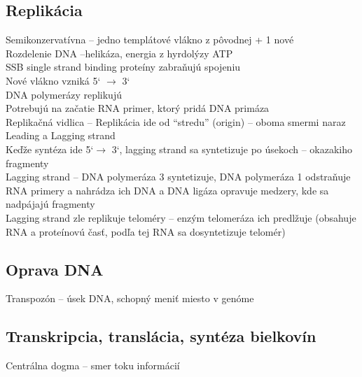 \subsection{Replikácia}
\tab Semikonzervatívna -- jedno templátové vlákno z pôvodnej + 1 nové\\
\tab Rozdelenie DNA --helikáza, energia z hyrdolýzy ATP\\
\tab \tab SSB single strand binding proteíny zabraňujú spojeniu\\
\tab Nové vlákno vzniká 5` $\rightarrow$ 3`\\
\tab DNA polymerázy replikujú\\
\tab \tab Potrebujú na začatie RNA primer, ktorý pridá DNA primáza\\
\tab Replikačná vidlica -- Replikácia ide od “stredu” (origin) -- oboma smermi naraz\\
\tab Leading a Lagging strand\\
\tab \tab Keďže syntéza ide 5`$\rightarrow$ 3`, lagging strand sa syntetizuje po úsekoch -- okazakiho fragmenty\\
\tab \tab Lagging strand -- DNA polymeráza 3 syntetizuje, DNA polymeráza 1 odstraňuje RNA primery a nahrádza ich DNA a  DNA ligáza opravuje medzery, kde sa nadpájajú fragmenty\\
\tab \tab Lagging strand zle replikuje teloméry -- enzým telomeráza ich predlžuje (obsahuje RNA a proteínovú časť, podľa tej RNA sa dosyntetizuje telomér)\\
\subsection{Oprava DNA}
Transpozón -- úsek DNA, schopný meniť miesto v genóme\\
\subsection{Transkripcia, translácia, syntéza bielkovín}
Centrálna dogma -- smer toku informácií\\

